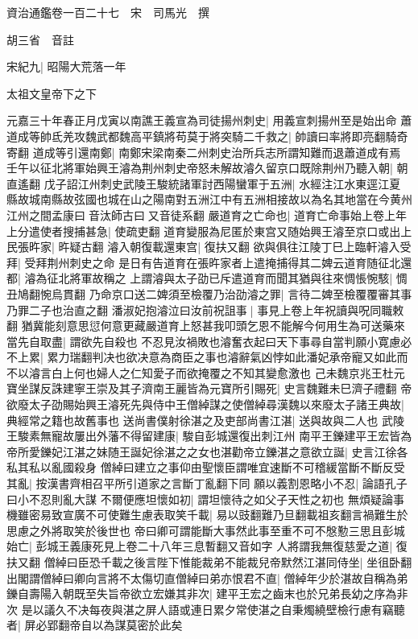資治通鑑卷一百二十七　宋　司馬光　撰

胡三省　音註

宋紀九|{
	昭陽大荒落一年}


太祖文皇帝下之下

元嘉三十年春正月戊寅以南譙王義宣為司徒揚州刺史|{
	用義宣刺揚州至是始出命}
蕭道成等帥氐羌攻魏武都魏高平鎮將苟莫于將突騎二千救之|{
	帥讀曰率將即亮翻騎奇寄翻}
道成等引還南鄭|{
	南鄭宋梁南秦二州刺史治所兵志所謂知難而退蕭道成有焉}
壬午以征北將軍始興王濬為荆州刺史帝怒未解故濬久留京口既除荆州乃聽入朝|{
	朝直遙翻}
戊子詔江州刺史武陵王駿統諸軍討西陽蠻軍于五洲|{
	水經注江水東逕江夏縣故城南縣故弦國也城在山之陽南對五洲江中有五洲相接故以為名其地當在今黄州江州之間孟康曰音汰師古曰又音徒系翻}
嚴道育之亡命也|{
	道育亡命事始上卷上年}
上分遣使者搜捕甚急|{
	使疏吏翻}
道育變服為尼匿於東宫又随始興王濬至京口或出上民張旿家|{
	旿疑古翻}
濬入朝復載還東宫|{
	復扶又翻}
欲與俱往江陵丁巳上臨軒濬入受拜|{
	受拜荆州刺史之命}
是日有告道育在張旿家者上遣掩捕得其二婢云道育随征北還都|{
	濬為征北將軍故稱之}
上謂濬與太子劭已斥遣道育而聞其猶與往來惆悵惋駭|{
	惆丑鳩翻惋烏貫翻}
乃命京口送二婢須至檢覆乃治劭濬之罪|{
	言待二婢至檢覆覆審其事乃罪二子也治直之翻}
潘淑妃抱濬泣曰汝前祝詛事|{
	事見上卷上年祝讀與呪同職敕翻}
猶冀能刻意思愆何意更藏嚴道育上怒甚我叩頭乞恩不能解今何用生為可送藥來當先自取盡|{
	謂欲先自殺也}
不忍見汝禍敗也濬奮衣起曰天下事尋自當判願小寛慮必不上累|{
	累力瑞翻判决也欲决意為商臣之事也濬辭氣凶悖如此潘妃承帝寵又如此而不以濬言白上何也婦人之仁知愛子而欲掩覆之不知其變愈激也}
己未魏京兆王杜元寶坐謀反誅建寧王崇及其子濟南王麗皆為元寶所引賜死|{
	史言魏難未巳濟子禮翻}
帝欲廢太子劭賜始興王濬死先與侍中王僧綽謀之使僧綽尋漢魏以來廢太子諸王典故|{
	典經常之籍也故舊事也}
送尚書僕射徐湛之及吏部尚書江湛|{
	送與故與二人也}
武陵王駿素無寵故屢出外藩不得留建康|{
	駿自彭城還復出刺江州}
南平王鑠建平王宏皆為帝所愛鑠妃江湛之妹随王誕妃徐湛之之女也湛勸帝立鑠湛之意欲立誕|{
	史言江徐各私其私以亂國殺身}
僧綽曰建立之事仰由聖懷臣謂唯宜速斷不可稽緩當斷不斷反受其亂|{
	按漢書齊相召平所引道家之言斷丁亂翻下同}
願以義割恩略小不忍|{
	論語孔子曰小不忍則亂大謀}
不爾便應坦懷如初|{
	謂坦懷待之如父子天性之初也}
無煩疑論事機雖密易致宣廣不可使難生慮表取笑千載|{
	易以豉翻難乃旦翻載祖亥翻言禍難生於思慮之外將取笑於後世也}
帝曰卿可謂能斷大事然此事至重不可不慇懃三思且彭城始亡|{
	彭城王義康死見上卷二十八年三息暫翻又音如字}
人將謂我無復慈愛之道|{
	復扶又翻}
僧綽曰臣恐千載之後言陛下惟能裁弟不能裁兒帝默然江湛同侍坐|{
	坐徂卧翻}
出閣謂僧綽曰卿向言將不太傷切直僧綽曰弟亦恨君不直|{
	僧綽年少於湛故自稱為弟}
鑠自壽陽入朝既至失旨帝欲立宏嫌其非次|{
	建平王宏之齒末也於兄弟長幼之序為非次}
是以議久不决每夜與湛之屏人語或連日累夕常使湛之自秉燭繞壁檢行慮有竊聽者|{
	屏必郢翻帝自以為謀莫密於此矣}
